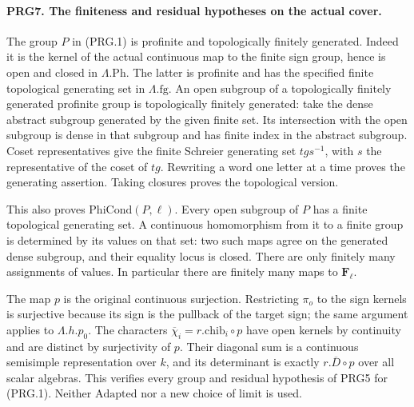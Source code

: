 \paragraph{PRG7. The finiteness and residual hypotheses on the actual cover.}
\label{claim:PRG7}
The group \(P\) in (PRG.1) is profinite and topologically finitely
generated. Indeed it is the kernel of the actual continuous map to
the finite sign group, hence is open and closed in
\(\Lambda.\mathrm{Ph}\). The latter is profinite and has the
specified finite topological generating set in \(\Lambda.\mathrm{fg}\).
An open subgroup of a topologically finitely generated profinite
group is topologically finitely generated: take the dense abstract
subgroup generated by the given finite set. Its intersection with
the open subgroup is dense in that subgroup and has finite index
in the abstract subgroup. Coset representatives give the finite
Schreier generating set \(tgs^{-1}\), with \(s\) the representative
of the coset of \(tg\). Rewriting a word one letter at a time proves
the generating assertion. Taking closures proves the topological
version.

This also proves \(\mathrm{PhiCond}(P,\ell)\). Every open subgroup
of \(P\) has a finite topological generating set. A continuous
homomorphism from it to a finite group is determined by its values
on that set: two such maps agree on the generated dense subgroup,
and their equality locus is closed. There are only finitely many
assignments of values. In particular there are finitely many maps
to \(\mathbf F_\ell\).

The map \(p\) is the original continuous surjection. Restricting
\(\pi_o\) to the sign kernels is surjective because its sign is
the pullback of the target sign; the same argument applies to
\(\Lambda.h.p_0\). The characters
\(\overline\chi_i=r.\mathrm{chib}_i\circ p\) have open kernels
by continuity and are distinct by surjectivity of \(p\).
Their diagonal sum is a continuous semisimple representation over
\(k\), and its determinant is exactly
\(r.\overline D\circ p\) over all scalar algebras. This verifies
every group and residual hypothesis of PRG5 for (PRG.1). Neither
\(\mathrm{Adapted}\) nor a new choice of limit is used.

